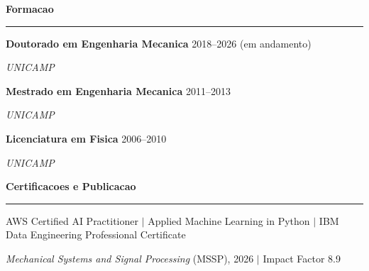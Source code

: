 \documentclass[10pt,a4paper]{article}
\newcommand{\cvsection}[1]{%
    \vspace{0.34em}
    {\large\bfseries\color{cvblue} #1}\par
    \vspace{0.05em}
    {\color{cvblue}\hrule}
    \vspace{0.15em}
}
\newcommand{\cvdegree}[3]{%
    \textbf{#1} \hfill {\color{cvblue}#3}\par
    \textit{#2}\par
    \vspace{0.06em}
}
\begin{document}
\cvsection{Formacao}

\cvdegree{Doutorado em Engenharia Mecanica}{UNICAMP}{2018--2026 (em andamento)}
\cvdegree{Mestrado em Engenharia Mecanica}{UNICAMP}{2011--2013}
\cvdegree{Licenciatura em Fisica}{UNICAMP}{2006--2010}

\cvsection{Certificacoes e Publicacao}
AWS Certified AI Practitioner $\mid$ Applied Machine Learning in Python $\mid$ IBM Data Engineering Professional Certificate\par
\textit{Mechanical Systems and Signal Processing} (MSSP), 2026 $\mid$ Impact Factor 8.9
\end{document}
